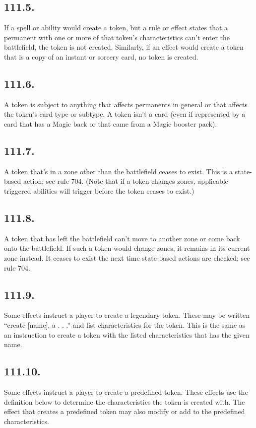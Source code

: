 \subsection*{111.5.}
If a spell or ability would create a token, but a rule or effect states that a permanent with one or more of that token’s characteristics can’t enter the battlefield, the token is not created. Similarly, if an effect would create a token that is a copy of an instant or sorcery card, no token is created.

\subsection*{111.6.}
A token is subject to anything that affects permanents in general or that affects the token’s card type or subtype. A token isn’t a card (even if represented by a card that has a Magic back or that came from a Magic booster pack).

\subsection*{111.7.}
A token that’s in a zone other than the battlefield ceases to exist. This is a state-based action; see rule 704. (Note that if a token changes zones, applicable triggered abilities will trigger before the token ceases to exist.)

\subsection*{111.8.}
A token that has left the battlefield can’t move to another zone or come back onto the battlefield. If such a token would change zones, it remains in its current zone instead. It ceases to exist the next time state-based actions are checked; see rule 704.

\subsection*{111.9.}
Some effects instruct a player to create a legendary token. These may be written “create [name], a . . .” and list characteristics for the token. This is the same as an instruction to create a token with the listed characteristics that has the given name.

\subsection*{111.10.}
Some effects instruct a player to create a predefined token. These effects use the definition below to determine the characteristics the token is created with. The effect that creates a predefined token may also modify or add to the predefined characteristics.

